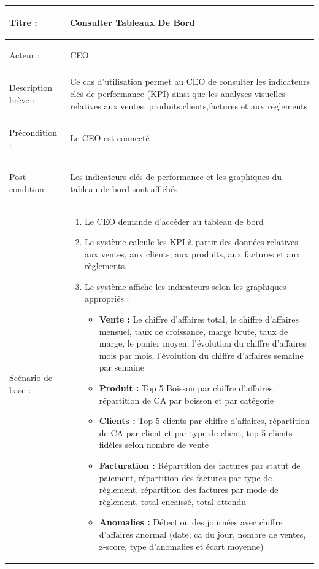 \begin{longtable}{|>{\bfseries\raggedright\arraybackslash}p{3.5cm}|p{\dimexpr\textwidth-3.5cm-4\tabcolsep-2\arrayrulewidth}|}
\hline
Titre : & Consulter Tableaux De Bord \\
\hline
Acteur : & CEO \\
\hline
Description brève : & Ce cas d'utilisation permet au CEO de consulter les indicateurs clés de performance (KPI) ainsi que les analyses visuelles relatives aux ventes, produits.clients,factures et aux reglements\\
\hline
Précondition : & Le CEO est connecté \\
\hline
Post-condition : & Les indicateurs clés de performance et les graphiques du tableau de bord sont affichés \\
\hline
Scénario de base : &
\begin{enumerate}[leftmargin=1.5em, topsep=2pt, itemsep=1pt]
  \item Le CEO demande d'accéder au tableau de bord
  \item Le système calcule les KPI à partir des données relatives aux ventes, aux clients, aux produits, aux factures et aux règlements.
  \item Le système affiche les indicateurs selon les graphiques appropriés :
  \begin{itemize}[leftmargin=1.5em, topsep=2pt, itemsep=1pt]
    \item \textbf{Vente :} Le chiffre d'affaires total, le chiffre d'affaires mensuel, taux de croissance, marge brute, taux de marge, le panier moyen, l'évolution du chiffre d'affaires mois par mois, l'évolution du chiffre d'affaires semaine par semaine
    \item \textbf{Produit :} Top 5 Boisson par chiffre d'affaires, répartition de CA par boisson et par catégorie
    \item \textbf{Clients :} Top 5 clients par chiffre d'affaires, répartition de CA par client et par type de client, top 5 clients fidèles selon nombre de vente
    \item \textbf{Facturation :} Répartition des factures par statut de paiement, répartition des factures par type de règlement, répartition des factures par mode de règlement, total encaissé, total attendu
    \item \textbf{Anomalies :} Détection des journées avec chiffre d'affaires anormal (date, ca du jour, nombre de ventes, z-score, type d'anomalies et écart moyenne)
  \end{itemize}

\end{enumerate}
\end{longtable}
